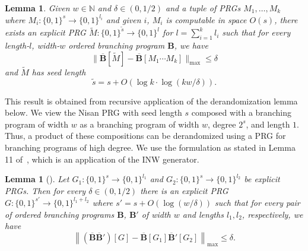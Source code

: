 \documentclass[11pt]{article}
\numberwithin{equation}{section}
\newtheorem{lemma}[theorem]{Lemma}
\theoremstyle{definition}
\theoremstyle{plain}
\newcommand{\N}{\mathbb N}
\newcommand{\zo}{\{0,1\}}
\newcommand{\ra}{\rightarrow}
\newcommand{\lbar}{\left\|}
\newcommand{\rbar}{\right\|}
\newcommand{\bp}{{\mathbf{B}}}
\newcommand{\bbp}{\overline{\mathbf{B}}}
\newcommand{\ts}{\tilde{s}}
\begin{document}
\begin{lemma}
\label{lem:pathInnerTool}
Given $w\in \N$ and $\delta \in (0,1/2)$ and a tuple of PRGs $M_1,\ldots,M_{k}$ where $M_i:\zo^{s}\ra \zo^{l_i}$ and given $i$, $M_i$ is computable in space $O(s)$, there exists an explicit PRG $\widetilde{M}:\zo^{\ts}\ra\zo^l$ for $l=\sum_{i=1}^k l_i$ such that for every length-$l$, width-$w$ ordered branching program $\bp$, we have 
\[\|\bbp[\widetilde{M}]-\bbp[M_1\cdots M_k]\|_{\max}\leq \delta\] 
and $\widetilde{M}$ has seed length
\[\ts=s+O(\log k\cdot\log(kw/\delta)).\]
\end{lemma}

This result is obtained from recursive application of the derandomization lemma below. We view the Nisan PRG with seed length $s$ composed with a branching program of width $w$ as a branching program of width $w$, degree $2^s$, and length $1$. Thus, a product of these compositions can be derandomized using a PRG for branching programs of high degree. We use the formulation as stated in Lemma 11 of~\cite{ChattopadhyayLi20}, which is an application of the 
INW generator. %
\begin{lemma}[\cite{ImpagliazzoNiWi94}]
Let $G_1:\zo^s \ra \zo^{l_1}$ and $G_2:\zo^s\ra \zo^{l_2}$ be explicit PRGs. Then for every $\delta \in (0,1/2)$ there is an explicit PRG $G:\zo^{s'}\ra \zo^{l_1+l_2}$ where $s'=s+O(\log(w/\delta))$ such that for every pair of ordered branching programs $\bp$, $\bp'$ of width $w$ and lengths $l_1,l_2$, respectively, %
we have 
$$\lbar(\bbp\bbp')[G] -\bbp[G_1]\bbp'[G_2]\rbar_{\max}\leq \delta.$$
\end{lemma}
\end{document}
